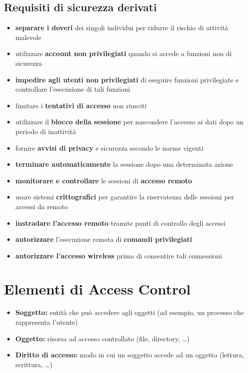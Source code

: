 \subsection{Requisiti di sicurezza derivati}
\begin{itemize}
    \item \textbf{separare i doveri} dei singoli individui per ridurre il rischio di attività malevole
    \item utilizzare \textbf{account non privilegiati} quando si accede a funzioni non di sicurezza 
    \item \textbf{impedire agli utenti non privilegiati} di eseguire funzioni privilegiate e controllare 
    l'esecuzione di tali funzioni 
    \item limitare i \textbf{tentativi di accesso} non riusciti 
    \item utilizzare il \textbf{blocco della sessione} per nascondere l'accesso ai dati dopo un periodo di inattività
    \item fornire \textbf{avvisi di privacy} e sicurezza secondo le norme vigenti 
    \item \textbf{terminare automaticamente} la sessione dopo una determinata azione 
    \item \textbf{monitorare e controllare} le sessioni di \textbf{accesso remoto}
    \item usare sistemi \textbf{crittografici} per garantire la riservatezza delle sessioni per accessi da remoto 
    \item \textbf{instradare l'accesso remoto} tramite punti di controllo degli accessi 
    \item \textbf{autorizzare} l'esecuzione remota di \textbf{comandi privilegiati}
    \item \textbf{autorizzare l'accesso wireless} prima di consentire tali connessioni
\end{itemize}

\section{Elementi di Access Control}
\begin{itemize}
    \item \textbf{Soggetto:} entità che può accedere agli oggetti (ad esempio, un processo che 
    rappresenta l'utente)
    \item \textbf{Oggetto:} risorsa ad accesso controllato (file, directory, \dots)
    \item \textbf{Diritto di accesso:} modo in cui un soggetto accede ad un oggetto (lettura, scrittura, \dots) 
\end{itemize}

